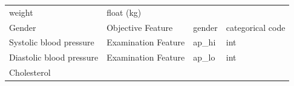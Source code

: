 \documentclass[11pt]{article}
\begin{document}
\begin{longtable}[]{@{}llll@{}}
\begin{minipage}[t]{0.20\columnwidth}
weight\strut
\end{minipage} & \begin{minipage}[t]{0.16\columnwidth}\raggedright\strut
float (kg)\strut
\end{minipage}\tabularnewline
\begin{minipage}[t]{0.12\columnwidth}\raggedright\strut
Gender\strut
\end{minipage} & \begin{minipage}[t]{0.18\columnwidth}\raggedright\strut
Objective Feature\strut
\end{minipage} & \begin{minipage}[t]{0.20\columnwidth}\raggedright\strut
gender\strut
\end{minipage} & \begin{minipage}[t]{0.16\columnwidth}\raggedright\strut
categorical code\strut
\end{minipage}\tabularnewline
\begin{minipage}[t]{0.12\columnwidth}\raggedright\strut
Systolic blood pressure\strut
\end{minipage} & \begin{minipage}[t]{0.18\columnwidth}\raggedright\strut
Examination Feature\strut
\end{minipage} & \begin{minipage}[t]{0.20\columnwidth}\raggedright\strut
ap\_hi\strut
\end{minipage} & \begin{minipage}[t]{0.16\columnwidth}\raggedright\strut
int\strut
\end{minipage}\tabularnewline
\begin{minipage}[t]{0.12\columnwidth}\raggedright\strut
Diastolic blood pressure\strut
\end{minipage} & \begin{minipage}[t]{0.18\columnwidth}\raggedright\strut
Examination Feature\strut
\end{minipage} & \begin{minipage}[t]{0.20\columnwidth}\raggedright\strut
ap\_lo\strut
\end{minipage} & \begin{minipage}[t]{0.16\columnwidth}\raggedright\strut
int\strut
\end{minipage}\tabularnewline
\begin{minipage}[t]{0.12\columnwidth}\raggedright\strut
Cholesterol\strut
\end{minipage} & \begin{minipage}[t]{0.18\columnwidth}\raggedright\strut

\end{minipage}
\end{longtable}
\end{document}
